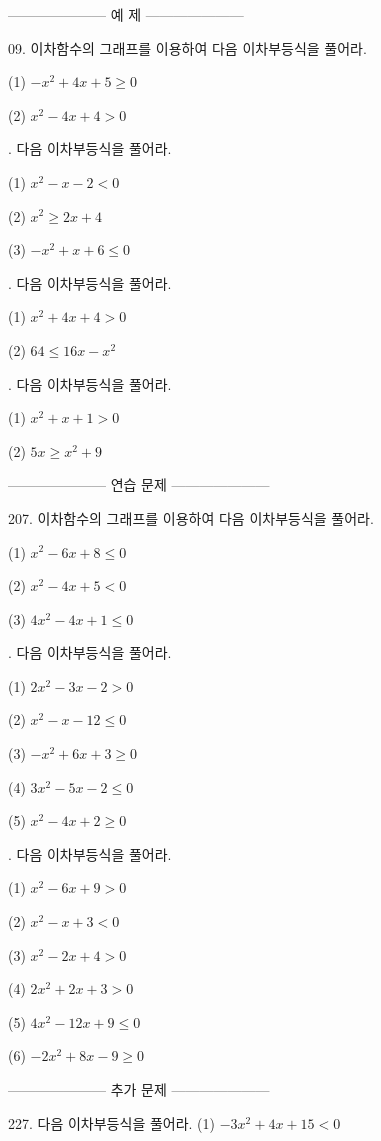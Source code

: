 \documentclass{article}
\begin{document}
\newpage
--------------------- 예 제 ---------------------

09.
이차함수의 그래프를 이용하여 다음 이차부등식을 풀어라.

\quad\:
(1) \(-x^2+4x+5\ge0\)

\quad\:
(2) \(x^2-4x+4>0\)

.
다음 이차부등식을 풀어라.

\quad\:
(1) \(x^2-x-2<0\)

\quad\:
(2) \(x^2\ge2x+4\)

\quad\:
(3) \(-x^2+x+6\le0\)

.
다음 이차부등식을 풀어라.

\quad\:
(1) \(x^2+4x+4>0\)

\quad\:
(2) \(64\le16x-x^2\)


.
다음 이차부등식을 풀어라.

\quad\:
(1) \(x^2+x+1>0\)

\quad\:
(2) \(5x\ge x^2+9\)

\bigskip\bigskip
--------------------- 연습 문제 ---------------------

207.
이차함수의 그래프를 이용하여 다음 이차부등식을 풀어라.

\quad\:
(1) \(x^2-6x+8\le0\)

\quad\:
(2) \(x^2-4x+5<0\)

\quad\:
(3) \(4x^2-4x+1\le0\)

.
다음 이차부등식을 풀어라.

\quad\:
(1) \(2x^2-3x-2>0\)

\quad\:
(2) \(x^2-x-12\le0\)

\quad\:
(3) \(-x^2+6x+3\ge0\)

\quad\:
(4) \(3x^2-5x-2\le0\)

\quad\:
(5) \(x^2-4x+2\ge0\)

.
다음 이차부등식을 풀어라.

\quad\:
(1) \(x^2-6x+9>0\)

\quad\:
(2) \(x^2-x+3<0\)

\quad\:
(3) \(x^2-2x+4>0\)

\quad\:
(4) \(2x^2+2x+3>0\)

\quad\:
(5) \(4x^2-12x+9\le0\)

\quad\:
(6) \(-2x^2+8x-9\ge0\)

--------------------- 추가 문제 ---------------------

227.
다음 이차부등식을 풀어라.
\quad\:
(1) \(-3x^2+4x+15<0\)
\end{document}
